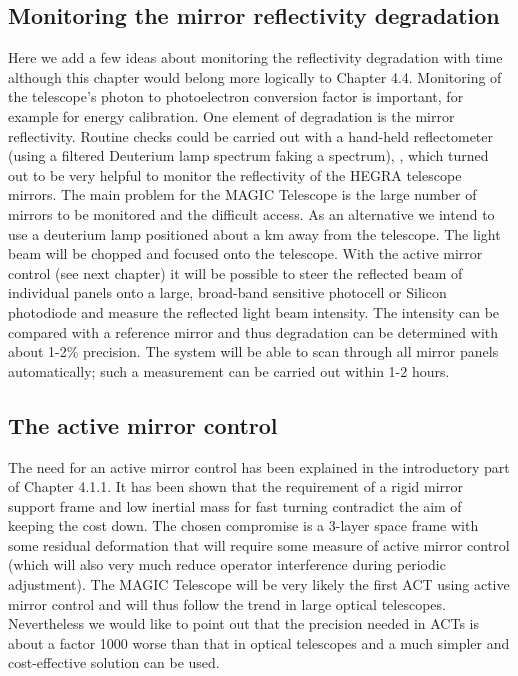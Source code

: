 \subsection{Monitoring the mirror reflectivity degradation}


\medskip Here we add a few ideas about monitoring the reflectivity
degradation with time although this chapter would belong more logically to
Chapter 4.4. Monitoring of the telescope's photon to photoelectron
conversion factor is important, for example for energy calibration. One element of
degradation is the mirror reflectivity. Routine checks could be carried out
with a hand-held reflectometer (using a filtered Deuterium lamp spectrum
faking a \Cerenkov spectrum), \cite{bradbury:95}, which turned out to be very
helpful to monitor the reflectivity of the HEGRA telescope mirrors. The main
problem for the MAGIC Telescope is the large number of mirrors to be monitored and the
difficult access. As an alternative we intend to use a deuterium lamp
positioned about a km away from the telescope. The light beam will be
chopped and focused onto the telescope. With the active mirror control (see
next chapter) it will be possible to steer the reflected beam of individual
panels onto a large, broad-band sensitive photocell or Silicon photodiode and
measure the reflected light beam intensity. The intensity can be compared
with a reference mirror and thus degradation can be determined with about
1-2\% precision. The system will be able to scan through all mirror panels
automatically; such a measurement can be carried out within 1-2 hours.

\subsection{The active mirror control}


\medskip The need for an active mirror control has been explained in the
introductory part of Chapter 4.1.1. It has been shown that the requirement
of a rigid mirror support frame and low inertial mass for fast turning
contradict the aim of keeping the cost down. The chosen compromise is a
3-layer space frame with some residual deformation that will require some measure
of active mirror control (which will also very much reduce operator
interference during periodic adjustment). The MAGIC Telescope will be very likely the
first ACT using active mirror control and will thus follow the trend in
large optical telescopes. Nevertheless we would like to point out that the
precision needed in ACTs is about a factor 1000 worse than that in optical
telescopes and a much simpler and cost-effective solution can be used.

